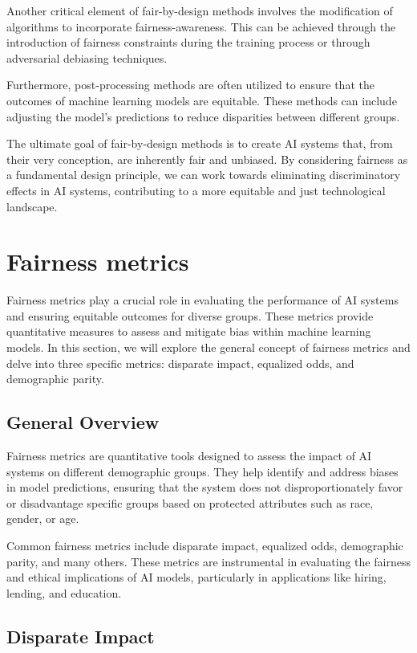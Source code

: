 \documentclass[12pt,a4paper,openright,twoside]{book}
\begin{document}
Another critical element of fair-by-design methods involves the modification of algorithms to incorporate fairness-awareness. This can be achieved through the introduction of fairness constraints during the training process or through adversarial debiasing techniques. 

Furthermore, post-processing methods are often utilized to ensure that the outcomes of machine learning models are equitable. These methods can include adjusting the model's predictions to reduce disparities between different groups. 

The ultimate goal of fair-by-design methods is to create AI systems that, from their very conception, are inherently fair and unbiased. By considering fairness as a fundamental design principle, we can work towards eliminating discriminatory effects in AI systems, contributing to a more equitable and just technological landscape. 

\newpage
\section{Fairness metrics}

Fairness metrics play a crucial role in evaluating the performance of AI systems and ensuring equitable outcomes for diverse groups. These metrics provide quantitative measures to assess and mitigate bias within machine learning models. In this section, we will explore the general concept of fairness metrics and delve into three specific metrics: disparate impact, equalized odds, and demographic parity.

\subsection{General Overview}

Fairness metrics are quantitative tools designed to assess the impact of AI systems on different demographic groups. They help identify and address biases in model predictions, ensuring that the system does not disproportionately favor or disadvantage specific groups based on protected attributes such as race, gender, or age.

Common fairness metrics include disparate impact, equalized odds, demographic parity, and many others. These metrics are instrumental in evaluating the fairness and ethical implications of AI models, particularly in applications like hiring, lending, and education.

\subsection{Disparate Impact}
\end{document}
